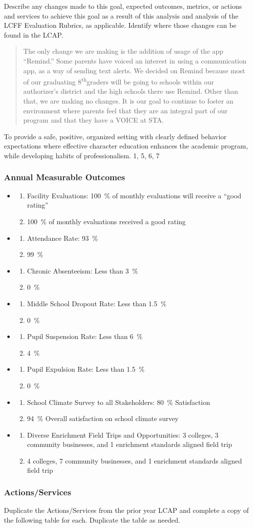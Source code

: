 \documentclass{article}
\makeatletter
\renewcommand{\th}{\textsuperscript{th}}
\newcounter{goal}[section] %
\newcommand*{\expact}[1]{%
	\expandafter\@expact\csname c@#1\endcsname%
}
\newcommand*{\@expact}[1]{%
	$\ifcase\intcalcAdd{1}{\intcalcMod{\intcalcSub{#1}{1}}{2}}
		\or{\text{Expected:}}
		\or{\text{Actual:}}
    \else\@ctrerr\fi$
}
\newcommand{\outcome}[2]{
	\item
	\begin{enumerate}[label=\expact*]
	\setlength{\itemsep}{0pt}
	\item #1
	\item #2
	\end{enumerate}
}
\newenvironment{outcomes}
	{
		\subsubsection{Annual Measurable Outcomes}
		\begin{itemize}[label={}]
	}
	{\end{itemize}}
\newcounter{action}[goal]
\makeatother
\begin{document}
Describe any changes made to this goal, expected outcomes, metrics, or actions and services to achieve this goal as a result of this analysis and analysis of the LCFF Evaluation Rubrics, as applicable. Identify where those changes can be found in the LCAP.
\begin{quotation}
	The only change we are making is the addition of usage of the app ``Remind.'' Some parents have voiced an interest in using a communication app, as a way of sending text alerts. We decided on Remind because most of our graduating 8\th graders will be going to schools within our authorizer's district and the high schools there use Remind. Other than that, we are making no changes. It is our goal to continue to foster an environment where parents feel that they are an integral part of our program and that they have a VOICE at STA.
\end{quotation}

\Goal
	{To provide a safe, positive, organized setting with clearly defined behavior expectations where effective character education enhances the academic program, while developing habits of professionalism.}
	{1, 5, 6, 7}
	{}

\begin{outcomes}
	\outcome
	{Facility Evaluations: \SI{100}{\percent} of monthly evaluations will receive a ``good rating''}
	{\SI{100}{\percent} of monthly evaluations received a good rating}
	\outcome
	{Attendance Rate: \SI{93}{\percent}}
	{\SI{99}{\percent}}
	\outcome
	{Chronic Absenteeism: Less than \SI{3}{\percent}}
	{\SI{0}{\percent}}
	\outcome
	{Middle School Dropout Rate: Less than \SI{1.5}{\percent}}
	{\SI{0}{\percent}}
	\outcome
	{Pupil Suspension Rate: Less than \SI{6}{\percent}}
	{\SI{4}{\percent}}
	\outcome
	{Pupil Expulsion Rate: Less than \SI{1.5}{\percent}}
	{\SI{0}{\percent}}
	\outcome
	{School Climate Survey to all Stakeholders: \SI{80}{\percent} Satisfaction}
	{\SI{94}{\percent} Overall satisfaction on school climate survey}
	\outcome
	{Diverse Enrichment Field Trips and Opportunities: 3 colleges, 3 community businesses, and 1 enrichment standards aligned field trip}
	{4 colleges, 7 community businesses, and 1 enrichment standards aligned field trip}
\end{outcomes}

\subsubsection{Actions/Services}
Duplicate the Actions/Services from the prior year LCAP and complete a copy of the following table for each. Duplicate the table as needed.
\end{document}
